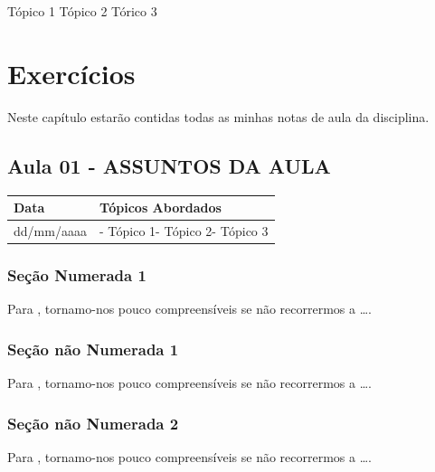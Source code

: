 \documentclass[
]{book}
\begin{document}
Tópico 1
Tópico 2
Tórico 3

\hypertarget{exercuxedcios-1}{%
\chapter{Exercícios}\label{exercuxedcios-1}}

Neste capítulo estarão contidas todas as minhas notas de aula da disciplina.

\hypertarget{aula-01---assuntos-da-aula-6}{%
\section{Aula 01 - ASSUNTOS DA AULA}\label{aula-01---assuntos-da-aula-6}}

\begin{longtable}[]{@{}ll@{}}
\toprule()
Data & Tópicos Abordados \\
\midrule()
\endhead
dd/mm/aaaa & - Tópico 1- Tópico 2- Tópico 3 \\
\bottomrule()
\end{longtable}

\hypertarget{seuxe7uxe3o-numerada-1-23}{%
\subsection{Seção Numerada 1}\label{seuxe7uxe3o-numerada-1-23}}

Para \citet{BOCK2001}, tornamo-nos pouco compreensíveis se não recorrermos a \ldots.

\hypertarget{seuxe7uxe3o-nuxe3o-numerada-1-46}{%
\subsection*{Seção não Numerada 1}\label{seuxe7uxe3o-nuxe3o-numerada-1-46}}

Para \citet{BOCK2001}, tornamo-nos pouco compreensíveis se não recorrermos a \ldots.

\hypertarget{seuxe7uxe3o-nuxe3o-numerada-2-69}{%
\subsection*{Seção não Numerada 2}\label{seuxe7uxe3o-nuxe3o-numerada-2-69}}

Para \citet{BOCK2001}, tornamo-nos pouco compreensíveis se não recorrermos a \ldots.
\end{document}
